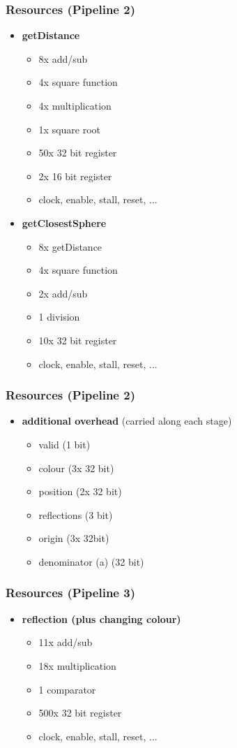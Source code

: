 \documentclass{beamer}
\begin{document}
\begin{frame}
	\frametitle{Resources (Pipeline 2)}
	\begin{itemize}
		\item \textbf{getDistance}
			\begin{itemize}
				\item 8x add/sub
				\item 4x square function
				\item 4x multiplication
				\item 1x square root
				\item 50x 32 bit register
				\item 2x 16 bit register
				\item clock, enable, stall, reset, ...
			\end{itemize}
		\item \textbf{getClosestSphere}
			\begin{itemize}
				\item 8x getDistance
				\item 4x square function
				\item 2x add/sub
				\item 1 division
				\item 10x 32 bit register
				\item clock, enable, stall, reset, ...
			\end{itemize}
	\end{itemize}
\end{frame}

\begin{frame}
	\frametitle{Resources (Pipeline 2)}
	\begin{itemize}
		\item \textbf{additional overhead} (carried along each stage)
			\begin{itemize}
				\item valid (1 bit)
				\item colour (3x 32 bit)
				\item position (2x 32 bit)
				\item reflections (3 bit)
				\item origin (3x 32bit)
				\item denominator (a) (32 bit)
			\end{itemize}
	\end{itemize}
\end{frame}

\begin{frame}
	\frametitle{Resources (Pipeline 3)}
	\begin{itemize}
		\item \textbf{reflection (plus changing colour)}
			\begin{itemize}
				\item 11x add/sub
				\item 18x multiplication
				\item 1 comparator
				\item 500x 32 bit register
				\item clock, enable, stall, reset, ...
			\end{itemize}
	\end{itemize}
\end{frame}
\end{document}
